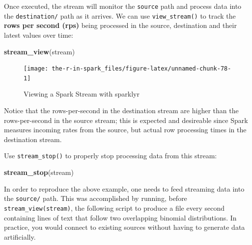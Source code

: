 \documentclass[]{book}
\newenvironment{Shaded}{\begin{snugshade}}{\end{snugshade}}
\newcommand{\DataTypeTok}[1]{\textcolor[rgb]{0.13,0.29,0.53}{#1}}
\newcommand{\KeywordTok}[1]{\textcolor[rgb]{0.13,0.29,0.53}{\textbf{#1}}}
\newcommand{\NormalTok}[1]{#1}
\newcommand{\OperatorTok}[1]{\textcolor[rgb]{0.81,0.36,0.00}{\textbf{#1}}}
\newcommand{\StringTok}[1]{\textcolor[rgb]{0.31,0.60,0.02}{#1}}
\theoremstyle{definition}
\theoremstyle{definition}
\theoremstyle{definition}
\theoremstyle{remark}
\begin{document}
\begin{Shaded}
\end{Shaded}

Once executed, the stream will monitor the \texttt{source} path and
process data into the \texttt{destination/} path as it arrives. We can
use \texttt{view\_stream()} to track the \textbf{rows per second (rps)}
being processed in the source, destination and their latest values over
time:

\begin{Shaded}
\begin{Highlighting}[]
\KeywordTok{stream_view}\NormalTok{(stream)}
\end{Highlighting}
\end{Shaded}

\begin{figure}

{\centering \texttt{[image: the-r-in-spark\_files/figure-latex/unnamed-chunk-78-1]} 

}

\caption{Viewing a Spark Stream with sparklyr}\label{fig:unnamed-chunk-78}
\end{figure}

Notice that the rows-per-second in the destination stream are higher
than the rows-per-second in the source stream; this is expected and
desireable since Spark measures incoming rates from the source, but
actual row processing times in the destination stream.

Use \texttt{stream\_stop()} to properly stop processing data from this
stream:

\begin{Shaded}
\begin{Highlighting}[]
\KeywordTok{stream_stop}\NormalTok{(stream)}
\end{Highlighting}
\end{Shaded}

In order to reproduce the above example, one needs to feed streaming
data into the \texttt{source/} path. This was accomplished by running,
before \texttt{stream\_view(stream)}, the following script to produce a
file every second containing lines of text that follow two overlapping
binomial distributions. In practice, you would connect to existing
sources without having to generate data artificially.
\end{document}
